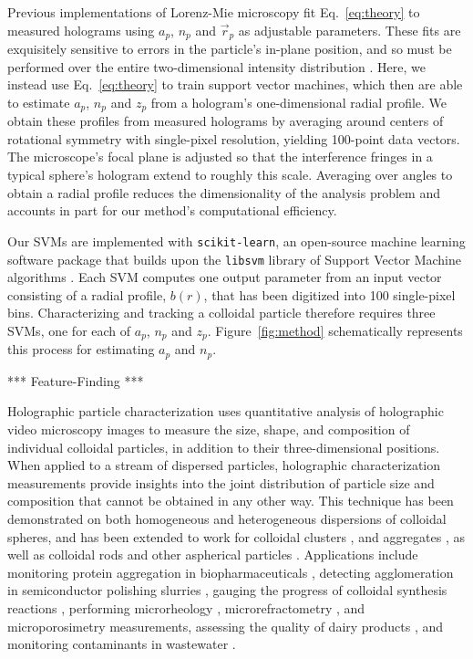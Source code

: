 Previous implementations of Lorenz-Mie microscopy \cite{lee07a} 
fit Eq.~\eqref{eq:theory} to measured holograms using $a_p$, $n_p$
and $\vec{r}_p$ as adjustable parameters.
These fits are exquisitely sensitive to errors in the particle's
in-plane position, and so must be performed over the entire
two-dimensional intensity distribution \cite{lee07a}.
Here, we instead use Eq.~\eqref{eq:theory} to train
support vector machines, which then are able to estimate 
$a_p$, $n_p$ and $z_p$ from a hologram's one-dimensional
radial profile.
We obtain these profiles from measured holograms by averaging
around centers of rotational symmetry \cite{krishnatreya14a}
with single-pixel resolution, yielding 100-point data vectors.
The microscope's focal plane is adjusted so that the interference
fringes in a typical sphere's hologram extend to roughly this scale.
Averaging over angles to obtain a radial profile reduces the
dimensionality of the analysis problem and accounts in
part for our method's computational efficiency.

Our SVMs are 
implemented with {\tt scikit-learn}, an open-source
machine learning software package \cite{pedregosa11} that
builds upon the {\tt libsvm} library of Support Vector Machine algorithms
\cite{chang01,chang02}.
Each SVM computes one output parameter from an input vector
consisting of a radial profile, $b(r)$, that has been digitized
into 100 single-pixel bins.
Characterizing and tracking a colloidal particle therefore requires
three SVMs, one for each of $a_p$, $n_p$ and $z_p$.
Figure~\ref{fig:method} schematically represents this process
for estimating $a_p$ and $n_p$.



***
Feature-Finding
***


Holographic particle characterization \cite{lee07a} uses 
quantitative analysis of holographic video microscopy images to 
measure the size, shape, and composition of individual colloidal
particles, in addition to their three-dimensional positions.
When applied to a stream of dispersed particles, holographic
characterization measurements provide insights into the
joint distribution of particle size and composition
that cannot be obtained in any other way.
This technique has been demonstrated on both homogeneous
and heterogeneous \cite{yevick14,philips17}
dispersions of colloidal spheres, and has been extended to work for 
colloidal clusters \cite{perry12,fung12,fung13}, and aggregates 
\cite{wang16,wang16a}, as well as colloidal rods \cite{cheong10} 
and other aspherical particles \cite{wang14using,hannel15}.
Applications include
monitoring protein aggregation in biopharmaceuticals \cite{wang16},
detecting agglomeration in semiconductor polishing slurries
\cite{cheong17}, 
gauging the progress of colloidal synthesis reactions \cite{wang15,wang15a},
performing microrheology \cite{cheong08}, 
microrefractometry \cite{shpaisman12}, 
and microporosimetry \cite{cheong11} measurements,
assessing the quality of dairy products \cite{cheong09a},
and monitoring contaminants 
in wastewater \cite{philips17}.

